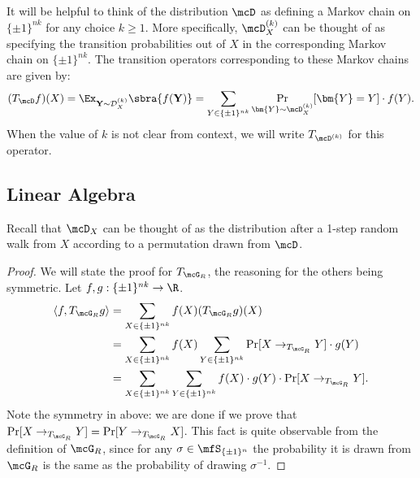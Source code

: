 It will be helpful to think of the distribution $\mcD$ as defining a Markov chain on $\{\pm1\}^{nk}$ for any choice $k \geq 1$. More specifically, $\mcD^{(k)}_X$ can be thought of as specifying the transition probabilities out of $X$ in the corresponding Markov chain on $\{\pm1\}^{nk}$. The transition operators corresponding to these Markov chains are given by:
\begin{align*}
    (T_{\mcD}f)(X)=\Ex_{\mathbf{Y} \sim \mathcal{D}_X^{(k)}}\sbra{f(\mathbf{Y})} = \sum_{Y \in \{\pm1\}^{nk}} \Pr_{\bm{Y}\sim\mcD_{X}^{(k)} }[\bm{Y}=Y] \cdot f(Y).
\end{align*}
When the value of $k$ is not clear from context, we will write $T_{\mcD^{(k)}}$ for this operator.



\subsection{Linear Algebra}
Recall that $\mcD_X$ can be thought of as the distribution after a 1-step random walk from $X$ according to a permutation drawn from $\mcD$.
\begin{proof}
We will state the proof for $T_{\mcG_R}$, the reasoning for the others being symmetric. Let $f, g : \{\pm1\}^{nk} \to \R$.
\begin{align*}
    \langle f, T_{\mcG_R} g \rangle &= \sum_{X \in \{\pm1\}^{nk}} f(X)(T_{\mcG_R}g)(X)\\
    &= \sum_{X \in \{\pm1\}^{nk}} f(X) \sum_{Y \in \{\pm1\}^{nk}} \Pr[X \to_{T_{\mcG_R}} Y] \cdot g(Y)\\
    &= \sum_{X \in \{\pm1\}^{nk}}\sum_{Y \in \{\pm1\}^{nk}} f(X) \cdot g(Y) \cdot \Pr[X \to_{T_{\mcG_R}} Y].
\end{align*}
Note the symmetry in above: we are done if we prove that $\Pr[X \to_{T_{\mcG_R}} Y] = \Pr[Y \to_{T_{\mcG_R}} X]$. This fact is quite observable from the definition of $\mcG_R$, since for any $\sigma \in \mfS_{\{\pm1\}^{n}}$ the probability it is drawn from $\mcG_R$ is the same as the probability of drawing $\sigma^{-1}$. 
\end{proof}


